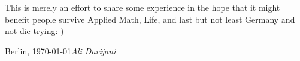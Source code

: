 %
%

\preface

This is merely an effort to share some experience in the hope that it might benefit people survive 
Applied Math, Life, and last but not least Germany and not die trying:-)

\vspace{\baselineskip}
\begin{flushright}\noindent
Berlin, \today \hfill {\it Ali Darijani}\\
\end{flushright}
